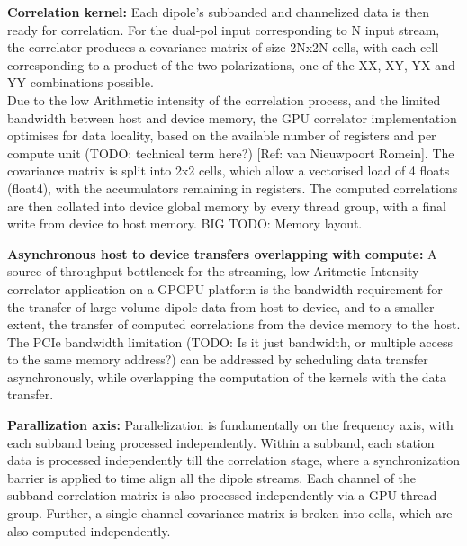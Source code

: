 \documentclass{aa}
\begin{document}
\textbf {Correlation kernel:}
Each dipole's subbanded and channelized data  is then ready for correlation. For
the dual-pol  input corresponding to N  input stream, the correlator  produces a
covariance matrix of size 2Nx2N cells, with each cell corresponding to a product
of the two polarizations, one of the XX, XY, YX and YY combinations possible.\\

Due to the low Arithmetic intensity  of the correlation process, and the limited
bandwidth  between host  and device  memory, the  GPU correlator  implementation
optimises for data locality, based on  the available number of registers and per
compute  unit (TODO:  technical term  here?) [Ref:  van Nieuwpoort  Romein]. The
covariance matrix is  split into 2x2 cells,  which allow a vectorised  load of 4
floats  (float4), with  the accumulators  remaining in  registers. The  computed
correlations are then collated into device  global memory by every thread group,
with a final write from device to host memory. BIG TODO: Memory layout.

\textbf  {Asynchronous host  to device  transfers overlapping  with compute:}  A
source  of throughput  bottleneck  for the  streaming,  low Aritmetic  Intensity
correlator application on a GPGPU platform  is the bandwidth requirement for the
transfer of  large volume  dipole data  from host  to device,  and to  a smaller
extent, the  transfer of  computed correlations  from the  device memory  to the
host. The  PCIe bandwidth limitation  (TODO: Is  it just bandwidth,  or multiple
access to the same memory address?) can be addressed by scheduling data transfer
asynchronously, while overlapping  the computation of the kernels  with the data
transfer.


\textbf {Parallization axis:} Parallelization  is fundamentally on the frequency
axis, with  each subband being  processed independently. Within a  subband, each
station  data is  processed independently  till the  correlation stage,  where a
synchronization barrier  is applied to time  align all the dipole  streams. Each
channel of the subband correlation matrix  is also processed independently via a
GPU thread  group. Further, a  single channel  covariance matrix is  broken into
cells, which are also computed independently.
\end{document}
